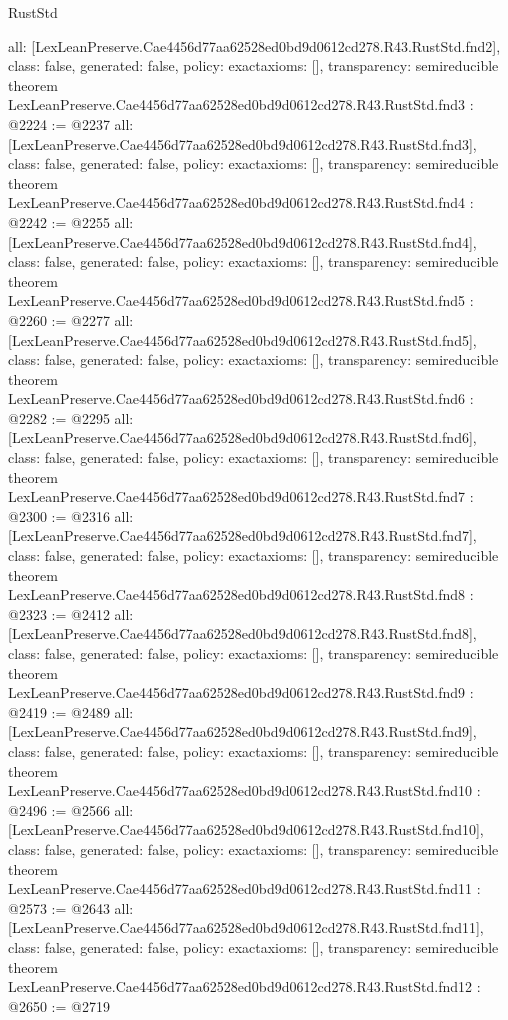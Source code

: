 \begin{lexlean}{RustStd}
\begin{coremodule}
{  all: [LexLeanPreserve.Cae4456d77aa62528ed0bd9d0612cd278.R43.RustStd.fnd2],
  class: false,
  generated: false,
  policy: exact{axioms: []},
  transparency: semireducible
}
theorem LexLeanPreserve.Cae4456d77aa62528ed0bd9d0612cd278.R43.RustStd.fnd3 : @2224 := @2237 {
  all: [LexLeanPreserve.Cae4456d77aa62528ed0bd9d0612cd278.R43.RustStd.fnd3],
  class: false,
  generated: false,
  policy: exact{axioms: []},
  transparency: semireducible
}
theorem LexLeanPreserve.Cae4456d77aa62528ed0bd9d0612cd278.R43.RustStd.fnd4 : @2242 := @2255 {
  all: [LexLeanPreserve.Cae4456d77aa62528ed0bd9d0612cd278.R43.RustStd.fnd4],
  class: false,
  generated: false,
  policy: exact{axioms: []},
  transparency: semireducible
}
theorem LexLeanPreserve.Cae4456d77aa62528ed0bd9d0612cd278.R43.RustStd.fnd5 : @2260 := @2277 {
  all: [LexLeanPreserve.Cae4456d77aa62528ed0bd9d0612cd278.R43.RustStd.fnd5],
  class: false,
  generated: false,
  policy: exact{axioms: []},
  transparency: semireducible
}
theorem LexLeanPreserve.Cae4456d77aa62528ed0bd9d0612cd278.R43.RustStd.fnd6 : @2282 := @2295 {
  all: [LexLeanPreserve.Cae4456d77aa62528ed0bd9d0612cd278.R43.RustStd.fnd6],
  class: false,
  generated: false,
  policy: exact{axioms: []},
  transparency: semireducible
}
theorem LexLeanPreserve.Cae4456d77aa62528ed0bd9d0612cd278.R43.RustStd.fnd7 : @2300 := @2316 {
  all: [LexLeanPreserve.Cae4456d77aa62528ed0bd9d0612cd278.R43.RustStd.fnd7],
  class: false,
  generated: false,
  policy: exact{axioms: []},
  transparency: semireducible
}
theorem LexLeanPreserve.Cae4456d77aa62528ed0bd9d0612cd278.R43.RustStd.fnd8 : @2323 := @2412 {
  all: [LexLeanPreserve.Cae4456d77aa62528ed0bd9d0612cd278.R43.RustStd.fnd8],
  class: false,
  generated: false,
  policy: exact{axioms: []},
  transparency: semireducible
}
theorem LexLeanPreserve.Cae4456d77aa62528ed0bd9d0612cd278.R43.RustStd.fnd9 : @2419 := @2489 {
  all: [LexLeanPreserve.Cae4456d77aa62528ed0bd9d0612cd278.R43.RustStd.fnd9],
  class: false,
  generated: false,
  policy: exact{axioms: []},
  transparency: semireducible
}
theorem LexLeanPreserve.Cae4456d77aa62528ed0bd9d0612cd278.R43.RustStd.fnd10 : @2496 := @2566 {
  all: [LexLeanPreserve.Cae4456d77aa62528ed0bd9d0612cd278.R43.RustStd.fnd10],
  class: false,
  generated: false,
  policy: exact{axioms: []},
  transparency: semireducible
}
theorem LexLeanPreserve.Cae4456d77aa62528ed0bd9d0612cd278.R43.RustStd.fnd11 : @2573 := @2643 {
  all: [LexLeanPreserve.Cae4456d77aa62528ed0bd9d0612cd278.R43.RustStd.fnd11],
  class: false,
  generated: false,
  policy: exact{axioms: []},
  transparency: semireducible
}
theorem LexLeanPreserve.Cae4456d77aa62528ed0bd9d0612cd278.R43.RustStd.fnd12 : @2650 := @2719 {
}
\end{coremodule}
\end{lexlean}
